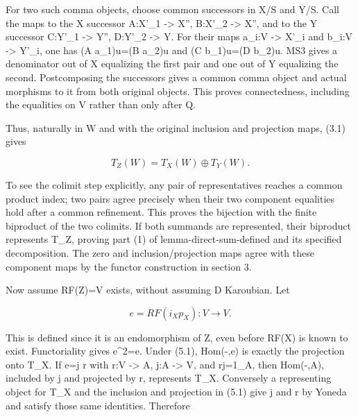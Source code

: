 For two such comma objects,\allowbreak{} choose common successors in X/\allowbreak{}S and Y/\allowbreak{}S. Call the maps to the X successor A:\allowbreak{}X'\_\allowbreak{}1 \allowbreak{}-> X'',\allowbreak{} B:\allowbreak{}X'\_\allowbreak{}2 \allowbreak{}-> X'',\allowbreak{} and to the Y successor C:\allowbreak{}Y'\_\allowbreak{}1 \allowbreak{}-> Y'',\allowbreak{} D:\allowbreak{}Y'\_\allowbreak{}2 \allowbreak{}-> Y\textquotesingle\textquotesingle. For their maps a\_\allowbreak{}i:\allowbreak{}V \allowbreak{}-> X'\_\allowbreak{}i and b\_\allowbreak{}i:\allowbreak{}V \allowbreak{}-> Y'\_\allowbreak{}i,\allowbreak{} one has (A a\_\allowbreak{}1)\allowbreak{}u\allowbreak{}=(B a\_\allowbreak{}2)\allowbreak{}u and (C b\_\allowbreak{}1)\allowbreak{}u\allowbreak{}=(D b\_\allowbreak{}2)\allowbreak{}u. MS3 gives a denominator out of X\textquotesingle\textquotesingle{} equalizing the first pair and one out of Y\textquotesingle\textquotesingle{} equalizing the second. Postcomposing the successors gives a common comma object and actual morphisms to it from both original objects. This proves connectedness,\allowbreak{} including the equalities on V rather than only after Q.

Thus,\allowbreak{} naturally in W and with the original inclusion and projection maps,\allowbreak{} (3.1)\allowbreak{} gives

\[
 T_Z(W)=T_X(W)\oplus T_Y(W).                              \tag{5.1}
\]

To see the colimit step explicitly,\allowbreak{} any pair of representatives reaches a common product index; two pairs agree precisely when their two component equalities hold after a common refinement. This proves the bijection with the finite biproduct of the two colimits. If both summands are represented,\allowbreak{} their biproduct represents T\_\allowbreak{}Z,\allowbreak{} proving part (1)\allowbreak{} of lemma-direct-sum-defined and its specified decomposition. The zero and inclusion/\allowbreak{}projection maps agree with these component maps by the functor construction in section 3.

Now assume RF(Z)\allowbreak{}\allowbreak{}=V exists,\allowbreak{} without assuming D\textquotesingle{} Karoubian. Let

\[
 e=RF(i_Xp_X):V\longrightarrow V.
\]

This is defined since it is an endomorphism of Z,\allowbreak{} even before RF(X)\allowbreak{} is known to exist. Functoriality gives e\textasciicircum{}2\allowbreak{}=e. Under (5.1)\allowbreak{},\allowbreak{} Hom(-,\allowbreak{}e)\allowbreak{} is exactly the projection onto T\_\allowbreak{}X. If e\allowbreak{}=j r with r:\allowbreak{}V \allowbreak{}-> A,\allowbreak{} j:\allowbreak{}A \allowbreak{}-> V,\allowbreak{} and rj\allowbreak{}=1\_\allowbreak{}A,\allowbreak{} then Hom(-,\allowbreak{}A)\allowbreak{},\allowbreak{} included by j and projected by r,\allowbreak{} represents T\_\allowbreak{}X. Conversely a representing object for T\_\allowbreak{}X and the inclusion and projection in (5.1)\allowbreak{} give j and r by Yoneda and satisfy those same identities. Therefore

